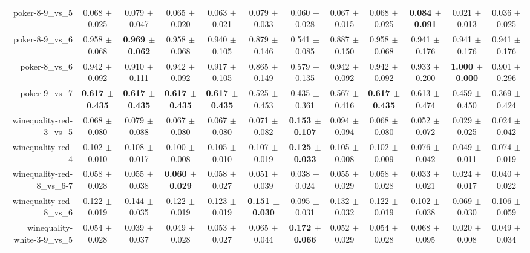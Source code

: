 \begin{table}[!ht]
{\begin{tabular}{r c c c c c c c c c c c}
poker-8-9\_vs\_5 & 0.068 $\pm$ 0.025 & 0.079 $\pm$ 0.047 & 0.065 $\pm$ 0.020 & 0.063 $\pm$ 0.021 & 0.079 $\pm$ 0.033 & 0.060 $\pm$ 0.028 & 0.067 $\pm$ 0.015 & 0.068 $\pm$ 0.025 & \textbf{0.084 $\pm$ 0.091} & 0.021 $\pm$ 0.013 & 0.036 $\pm$ 0.025 \\
poker-8-9\_vs\_6 & 0.958 $\pm$ 0.068 & \textbf{0.969 $\pm$ 0.062} & 0.958 $\pm$ 0.068 & 0.940 $\pm$ 0.105 & 0.879 $\pm$ 0.146 & 0.541 $\pm$ 0.085 & 0.887 $\pm$ 0.150 & 0.958 $\pm$ 0.068 & 0.941 $\pm$ 0.176 & 0.941 $\pm$ 0.176 & 0.941 $\pm$ 0.176 \\
poker-8\_vs\_6 & 0.942 $\pm$ 0.092 & 0.910 $\pm$ 0.111 & 0.942 $\pm$ 0.092 & 0.917 $\pm$ 0.105 & 0.865 $\pm$ 0.149 & 0.579 $\pm$ 0.135 & 0.942 $\pm$ 0.092 & 0.942 $\pm$ 0.092 & 0.933 $\pm$ 0.200 & \textbf{1.000 $\pm$ 0.000} & 0.901 $\pm$ 0.296 \\
poker-9\_vs\_7 & \textbf{0.617 $\pm$ 0.435} & \textbf{0.617 $\pm$ 0.435} & \textbf{0.617 $\pm$ 0.435} & \textbf{0.617 $\pm$ 0.435} & 0.525 $\pm$ 0.453 & 0.435 $\pm$ 0.361 & 0.567 $\pm$ 0.416 & \textbf{0.617 $\pm$ 0.435} & 0.613 $\pm$ 0.474 & 0.459 $\pm$ 0.450 & 0.369 $\pm$ 0.424 \\
winequality-red-3\_vs\_5 & 0.068 $\pm$ 0.080 & 0.079 $\pm$ 0.088 & 0.067 $\pm$ 0.080 & 0.067 $\pm$ 0.080 & 0.071 $\pm$ 0.082 & \textbf{0.153 $\pm$ 0.107} & 0.094 $\pm$ 0.094 & 0.068 $\pm$ 0.080 & 0.052 $\pm$ 0.072 & 0.029 $\pm$ 0.025 & 0.024 $\pm$ 0.042 \\
winequality-red-4 & 0.102 $\pm$ 0.010 & 0.108 $\pm$ 0.017 & 0.100 $\pm$ 0.008 & 0.105 $\pm$ 0.010 & 0.107 $\pm$ 0.019 & \textbf{0.125 $\pm$ 0.033} & 0.105 $\pm$ 0.008 & 0.102 $\pm$ 0.009 & 0.076 $\pm$ 0.042 & 0.049 $\pm$ 0.011 & 0.074 $\pm$ 0.019 \\
winequality-red-8\_vs\_6-7 & 0.058 $\pm$ 0.028 & 0.055 $\pm$ 0.038 & \textbf{0.060 $\pm$ 0.029} & 0.058 $\pm$ 0.027 & 0.051 $\pm$ 0.039 & 0.038 $\pm$ 0.024 & 0.055 $\pm$ 0.029 & 0.058 $\pm$ 0.028 & 0.033 $\pm$ 0.021 & 0.024 $\pm$ 0.017 & 0.040 $\pm$ 0.022 \\
winequality-red-8\_vs\_6 & 0.122 $\pm$ 0.019 & 0.144 $\pm$ 0.035 & 0.122 $\pm$ 0.019 & 0.123 $\pm$ 0.019 & \textbf{0.151 $\pm$ 0.030} & 0.095 $\pm$ 0.031 & 0.132 $\pm$ 0.032 & 0.122 $\pm$ 0.019 & 0.102 $\pm$ 0.038 & 0.069 $\pm$ 0.030 & 0.106 $\pm$ 0.059 \\
winequality-white-3-9\_vs\_5 & 0.054 $\pm$ 0.028 & 0.039 $\pm$ 0.037 & 0.049 $\pm$ 0.028 & 0.053 $\pm$ 0.027 & 0.065 $\pm$ 0.044 & \textbf{0.172 $\pm$ 0.066} & 0.052 $\pm$ 0.029 & 0.054 $\pm$ 0.028 & 0.068 $\pm$ 0.095 & 0.020 $\pm$ 0.008 & 0.049 $\pm$ 0.034 \\

\end{tabular}}
\end{table}

